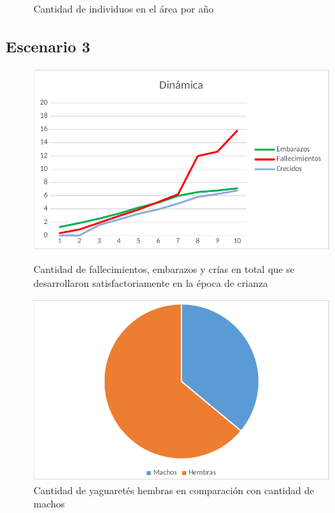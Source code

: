 \begin{figure}[!htb]
        \caption{Cantidad de individuos en el área por año}\label{fig:fig2-3}
        \endminipage
    \end{figure}

    \subsection{Escenario 3}

    \begin{figure}[!htb]
        \includegraphics[width=\linewidth]{images/esc3/dinamica}
        \caption{Cantidad de fallecimientos, embarazos y crías en total que se desarrollaron satisfactoriamente en la época de crianza}\label{fig:fig3-1}
        \endminipage\hfill
        \includegraphics[width=\linewidth]{images/esc3/genero}
        \caption{Cantidad de yaguaretés hembras en comparación con cantidad de machos}\label{fig:fig3-2}
        \endminipage\hfill

\end{figure}
